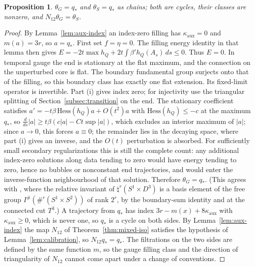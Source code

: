 \documentclass[11pt]{amsart}
\newtheorem{proposition}[theorem]{Proposition}
\theoremstyle{definition}
\theoremstyle{remark}
\theoremstyle{plain}
\numberwithin{equation}{section}
\newcommand{\Ish}{I^{\#}}
\begin{document}
\begin{proposition}\label{prop:filling-classes}
$\theta_G=q_*$ and $\theta_S=q_*$ as chains; both are cycles, their
classes are nonzero, and $N_{12}\theta_G=\theta_S$.
\end{proposition}

\begin{proof}
By Lemma~\ref{lem:aux-index} an index-zero filling has
$\kappa_{\mathrm{aux}}=0$ and $m(a)=3r$, so $a=q_*$.
First set $f=\eta=0$. The filling energy identity in that lemma
then gives
$E=-2t\max h_Q+2t\int\beta'h_Q(A_s)\,ds\le0$.
Thus $E=0$. In temporal gauge the end is stationary at the flat
maximum, and the connection on the unperturbed core is flat.
The boundary fundamental group surjects onto that of the filling,
so this boundary class has exactly one flat extension. Its fixed-limit
operator is invertible. Part (i) gives index zero; for injectivity use the
triangular splitting of Section~\ref{subsec:transition} on the end. The
stationary coefficient satisfies $a'=-t\beta\,\mathrm{Hess}(h_Q)a+O(t^2)a$ with
$\mathrm{Hess}(h_Q)\le-c$ at the maximum $q_*$, so
$\frac{d}{ds}|a|\ge t\beta(c|a|-Ct\sup|a|)$, which excludes an interior maximum of $|a|$;
since $a\to0$, this forces $a\equiv0$; the remainder lies in the decaying space, where part (i) gives
an inverse, and the $O(t)$ perturbation is absorbed. For sufficiently small secondary
regularizations this is still the complete count: any additional
index-zero solutions along data tending to zero would have energy
tending to zero, hence no bubbles or nonconstant end trajectories,
and would enter the inverse-function neighbourhood of that solution.
Therefore $\theta_G=q_*$. (This
agrees with \cite[Sections~7.7--7.8]{Scaduto}, where the relative invariant of
$\natural^r(S^1\times D^3)$ is a basis element of the free group
$\Ish(\#^r(S^1\times S^2))$ of rank $2^r$, by the boundary-sum identity
\cite[Section~7.2]{Scaduto} and \cite[Proposition~5.4]{KM-unknot} at the
connected cut $T^3$.) A trajectory from $q_*$ has index
$3r-m(x)+8\kappa_{\mathrm{aux}}$ with $\kappa_{\mathrm{aux}}\ge0$, which is never one, so $q_*$ is a
cycle on both sides. By Lemma~\ref{lem:aux-index} the map $N_{12}$ of
Theorem~\ref{thm:mixed-iso} satisfies the hypothesis of
Lemma~\ref{lem:calibration}, so $N_{12}q_*=q_*$. The filtrations on the
two sides are defined by the same function $m$, so the gauge filling
class and the direction of triangularity of $N_{12}$ cannot come apart
under a change of conventions.
\end{proof}
\end{document}
